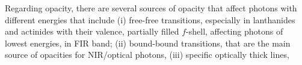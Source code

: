 Regarding opacity, there are several sources of opacity that affect photons with
different energies that include 
(i) free-free transitions, especially in lanthanides and actinides with their 
valence, partially filled $f$-shell, affecting photons of lowest energies, in \ac{FIR} band; 
%
(ii) bound-bound transitions, that are the main source of opacities for 
\ac{NIR}/optical photons, 
(iii) specific optically thick lines, 
